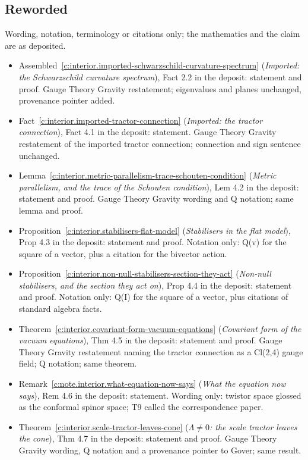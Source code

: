 \documentclass[11pt]{article}
\theoremstyle{definition}
\theoremstyle{plain}
\begin{document}
\subsection*{Reworded}
Wording, notation, terminology or citations only; the mathematics and the claim are as deposited.
\begin{itemize}\setlength{\itemsep}{2pt}
\item Assembled~\ref{c:interior.imported-schwarzschild-curvature-spectrum} (\emph{Imported: the Schwarzschild curvature spectrum}), Fact 2.2 in the deposit: statement and proof. Gauge Theory Gravity restatement; eigenvalues and planes unchanged, provenance pointer added.
\item Fact~\ref{c:interior.imported-tractor-connection} (\emph{Imported: the tractor connection}), Fact 4.1 in the deposit: statement. Gauge Theory Gravity restatement of the imported tractor connection; connection and sign sentence unchanged.
\item Lemma~\ref{c:interior.metric-parallelism-trace-schouten-condition} (\emph{Metric parallelism, and the trace of the Schouten condition}), Lem 4.2 in the deposit: statement and proof. Gauge Theory Gravity wording and Q notation; same lemma and proof.
\item Proposition~\ref{c:interior.stabilisers-flat-model} (\emph{Stabilisers in the flat model}), Prop 4.3 in the deposit: statement and proof. Notation only: Q(v) for the square of a vector, plus a citation for the bivector action.
\item Proposition~\ref{c:interior.non-null-stabilisers-section-they-act} (\emph{Non-null stabilisers, and the section they act on}), Prop 4.4 in the deposit: statement and proof. Notation only: Q(I) for the square of a vector, plus citations of standard algebra facts.
\item Theorem~\ref{c:interior.covariant-form-vacuum-equations} (\emph{Covariant form of the vacuum equations}), Thm 4.5 in the deposit: statement and proof. Gauge Theory Gravity restatement naming the tractor connection as a Cl(2,4) gauge field; Q notation; same theorem.
\item Remark~\ref{c:note.interior.what-equation-now-says} (\emph{What the equation now says}), Rem 4.6 in the deposit: statement. Wording only: twistor space glossed as the conformal spinor space; T9 called the correspondence paper.
\item Theorem~\ref{c:interior.scale-tractor-leaves-cone} (\emph{$\Lambda \neq 0$: the scale tractor leaves the cone}), Thm 4.7 in the deposit: statement and proof. Gauge Theory Gravity wording, Q notation and a provenance pointer to Gover; same result.

\end{itemize}
\end{document}
